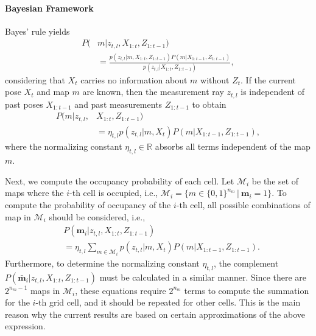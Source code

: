 \documentclass[letterpaper, 10pt, conference]{ieeeconf}
\newcommand{\refeqn}[1]{(\ref{eqn:#1})}
\renewcommand{\Re}{\ensuremath{\mathbb{R}}}
\begin{document}
\paragraph{Bayesian Framework}
Bayes' rule yields
\begin{align}
\label{eqn:BayesRuleRayISM}
P(&m|z_{t,l},X_{1:t},Z_{1:t-1})\nonumber
\\
&=\frac{p(z_{t,l}|m,X_{1:t},Z_{1:t-1})P(m|X_{1:t-1},Z_{1:t-1})}{p(z_{t,l}|X_{1:t},Z_{1:t-1})},
\end{align}
considering that $X_t$ carries no information about $m$ without $Z_t$.
If the current pose $X_t$ and map $m$ are known, then the measurement ray $z_{t,l}$ is independent of past poses $X_{1:t-1}$ and past measurements $Z_{1:t-1}$ to obtain
\begin{align}
P(m|z_{t,l},&X_{1:t},Z_{1:t-1})\nonumber
\\
&
=\eta_{t,l}p(z_{t,l}|m,X_{t})P(m|X_{1:t-1},Z_{1:t-1}),
\end{align}
where the normalizing constant $\eta_{t,l}\in\Re$ absorbs all terms independent of the map $m$.


Next, we compute the occupancy probability of each cell. Let $\mathcal{M}_i$ be the set of maps where the $i$-th cell is occupied, i.e., $\mathcal{M}_i =\{m\in\{0,1\}^{{n_m}}\,|\ \mathbf{m}_i=1\}$. To compute the probability of occupancy of the $i$-th cell, all possible combinations of map in $\mathcal{M}_i$ should be considered, i.e., 
\begin{align}
\label{eqn:InvSenModWithProbDens}
&P(\mathbf{m}_i|z_{t,l},X_{1:t},Z_{1:t-1})\nonumber
\\
&=\eta_{t,l}\sum_{m\in\mathcal{M}_i}p(z_{t,l}|m,X_{t})P(m|X_{1:t-1},Z_{1:t-1}).
\end{align}
Furthermore, to determine the normalizing constant $\eta_{t,l}$, the complement $P(\bar{\mathbf{m}}_i|z_{t,l},X_{1:t},Z_{1:t-1})$ must be calculated in a similar manner. Since there are $2^{n_{m}-1}$ maps in $\mathcal{M}_i$, these equations require $2^{n_m}$ terms to compute the summation for the $i$-th grid cell, and it should be repeated for other cells. This is the main reason why the current results are based on certain approximations of the above expression. 
\end{document}
